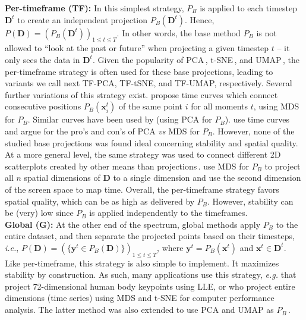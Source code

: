
\noindent\textbf{Per-timeframe (TF):} 
In this simplest strategy, $P_B$ is applied to each timestep $\mathbf{D}^t$ to create an independent projection $P_B(\mathbf{D}^t)$. Hence, $P(\mathbf{D}) = ( P_B(\mathbf{D}^t))_{ 1 \leq t \leq T}$. In other words, the base method $P_B$ is not allowed to ``look at the past or future'' when projecting a given timestep $t$ -- it only sees the data in $\mathbf{D}^t$. Given the popularity of PCA\,\citep{pca}, t-SNE\,\citep{vanderMaaten2008}, and UMAP\,\citep{umap}, the per-timeframe strategy is often used for these base projections, leading to variants we call next TF-PCA, TF-tSNE, and TF-UMAP, respectively. Several further variations of this strategy exist. \cite{bsk16} propose time curves which connect consecutive positions $P_B(\mathbf{x}_i^t)$ of the same point $i$ for all moments $t$, using MDS for $P_B$. Similar curves have been used by \cite{bws12} (using PCA for $P_B$). \cite{Brich2020} use time curves and argue for the pro's and con's of PCA \emph{vs} MDS for $P_B$. However, none of the studied base projections was found ideal concerning stability and spatial quality. At a more general level, the same strategy was used to connect different 2D scatterplots created by other means than projections\,\citep{hkf16}. \cite{Jackle2016} use MDS for $P_B$ to project all $n$ spatial dimensions of $\mathbf{D}$ to a single dimension and use the second dimension of the screen space to map time. 
Overall, the per-timeframe strategy favors spatial quality, which can be as high as delivered by $P_B$. However, stability can be (very) low since $P_B$ is applied independently to the timeframes. \\

\noindent\textbf{Global (G):}
At the other end of the spectrum, global methods apply $P_B$ to the entire dataset, and then separate the projected points based on their timesteps, \emph{i.e.}, $P(\mathbf{D}) = (\{\mathbf{y}^t \in P_B(\mathbf{D})\})_{1 \leq t \leq T}$, where $\mathbf{y}^t = P_B(\mathbf{x}^t)$ and $\mathbf{x}^t \in \mathbf{D}^t$. Like per-timeframe, this strategy is also simple to implement. It maximizes stability by construction. As such, many applications use this strategy, \emph{e.g.} \cite{Hu2010} that project 72-dimensional human body keypoints using LLE, or \cite{Fujiwara2018} who project entire dimensions (time series) using MDS and t-SNE for computer performance analysis. The latter method was also extended to use PCA and UMAP as $P_B$\,\citep{Fujiwara2020}.

